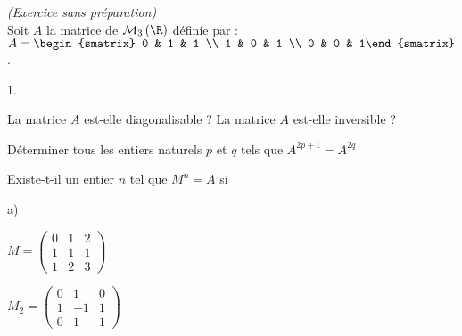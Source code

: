 \documentclass[11pt]{article}%
\begin{document}
\addtocounter{exercice}{-1}
\begin{exercice}{\it (Exercice sans préparation)}~\\
  Soit $A$ la matrice de $\mathcal{M}_{3}\left( \R\right) $ définie
  par : $A=%
  \begin{smatrix}
    0 & 1 & 1 \\
    1 & 0 & 1 \\
    0 & 0 & 1%
  \end{smatrix}%
  $.
  \begin{noliste}{1.}
  \item La matrice $A$ est-elle diagonalisable ? La matrice $A$
    est-elle inversible ?
  \item Déterminer tous les entiers naturels $p$ et $q$ tels que $%
    A^{2p+1}=A^{2q}$
  \item Existe-t-il un entier $n$ tel que $M^{n}=A$ si
    \begin{noliste}{a)}
    \item $M=\left(
        \begin{array}{ccc}
          0 & 1 & 2 \\
          1 & 1 & 1 \\
          1 & 2 & 3%
        \end{array}%
      \right) $
    \item $M_{2}=\left(
        \begin{array}{ccc}
          0 & 1 & 0 \\
          1 & -1 & 1 \\
          0 & 1 & 1%
        \end{array}%
      \right) $
    \end{noliste}    
  \end{noliste}
\end{exercice}


\end{document}
